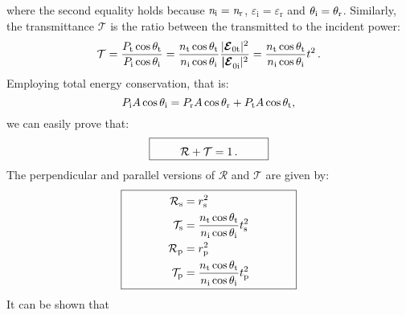 where the second equality holds because $\textit{n}_{\textrm{i}}= \textit{n}_{\textrm{r}}$, $\varepsilon_{\textrm{i}} = \varepsilon_{\textrm{r}}$ and $\theta_{\textrm{i}} = \theta_{\textrm{r}}$.
Similarly, the transmittance $\mathcal{T}$ is the ratio between the transmitted to the incident power:
\begin{equation}\label{transmittance}
\mathcal{T} = \frac{P_\textrm{t} \cos\theta_\textrm{t}}{P_\textrm{i}\cos\theta_\textrm{i}} = \frac{n_\textrm{t} \cos\theta_\textrm{t}}{n_\textrm{i} \cos\theta_\textrm{i}}\frac{|\boldsymbol{\mathcal{E}}_{0 \textrm{t}}|^2}{\boldsymbol{|\mathcal{E}}_{0 \textrm{i}}|^2} = \frac{n_\textrm{t} \cos\theta_\textrm{t}}{n_\textrm{i} \cos\theta_\textrm{i}} t^2\,.
\end{equation}
Employing total energy conservation, that is:
\begin{equation}
P_\textrm{i} A\cos\theta_\textrm{i} = P_\textrm{r} A\cos\theta_\textrm{r}+P_\textrm{t} A\cos\theta_\textrm{t},
\end{equation}
we can easily prove that:
\begin{equation}
\fbox{\begin{minipage}{10em}
\begin{equation*}
\mathcal{R}+\mathcal{T}=1\,.
\end{equation*}
\end{minipage}}
\end{equation}
 The perpendicular and parallel versions of $\mathcal{R}$ and $\mathcal{T}$ are given by:
\begin{equation}
\fbox{\begin{minipage}{15em}
\begin{equation*}\label{Fresnel_pands}
\begin{split}
\mathcal{R}_\textrm{s} &=  r_\textrm{s}^2\\
\mathcal{T}_\textrm{s} &= \frac{n_\textrm{t} \cos\myangle_\textrm{t}}{n_\textrm{i} \cos\myangle_\textrm{i}}t_\textrm{s}^2\\
\mathcal{R}_\textrm{p}& =  {r_\textrm{p}^2}\\
\mathcal{T}_\textrm{p} &=  \frac{n_\textrm{t} \cos\myangle_\textrm{t}}{n_\textrm{i} \cos\myangle_\textrm{i}}t_\textrm{p}^2\\
\end{split}
\end{equation*}
\end{minipage}}
\end{equation}
It can be shown that 
